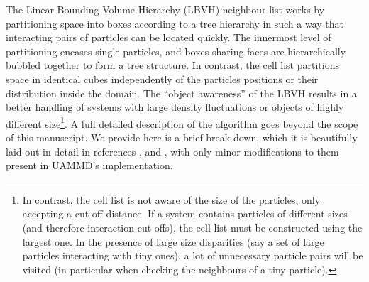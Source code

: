 \documentclass[twoside,openright,titlepage,numbers=noenddot,%
headinclude,footinclude,cleardoublepage=empty,abstract=on,
BCOR=5mm,fontsize=11pt, dvipsnames, paper=b5
]{scrreprt}
\begin{document}
The Linear Bounding Volume Hierarchy (LBVH) neighbour list works by partitioning space into boxes according to a tree hierarchy in such a way that interacting pairs of particles can be located quickly. The innermost level of partitioning encases single particles, and boxes sharing faces are hierarchically bubbled together to form a tree structure. In contrast, the cell list partitions space in identical cubes independently of the particles positions or their distribution inside the domain. The ``object awareness'' of the LBVH results in a better handling of systems with large density fluctuations or objects of highly different size\footnote{In contrast, the cell list is not aware of the size of the particles, only accepting a cut off distance. If a system contains particles of different sizes (and therefore interaction cut offs), the cell list must be constructed using the largest one. In the presence of large size disparities (say a set of large particles interacting with tiny ones), a lot of unnecessary particle pairs will be visited (in particular when checking the neighbours of a tiny particle).}.
A full detailed description of the algorithm goes beyond the scope of this manuscript. We provide here is a brief break down, which it is beautifully laid out in detail in references \cite{Howard2016}, \cite{Howard2019} and \cite{Torres2009}, with only minor modifications to them present in UAMMD's implementation.
\end{document}
